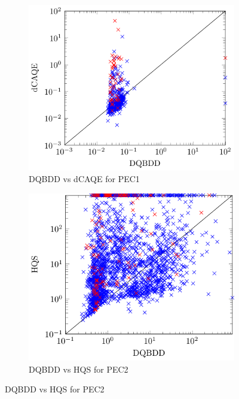 \documentclass[
  digital, %
  color,
  twoside, %
  table,   %
  nolof,     %
  nolot,     %
]{fithesis3}
\theoremstyle{definition}
\theoremstyle{remark}
\begin{document}
\begin{figure}[p]
  \centering
  \begin{subfigure}{0.48\textwidth}
    \centering
    \includegraphics[width=\linewidth]{figures/PEC1dqbddVSdcaqeSatUnsat.pdf}
    \caption{DQBDD vs dCAQE for PEC1}
    \label{fig:PEC1dqbddVSdcaqe}
  \end{subfigure}
  \begin{subfigure}{0.48\textwidth}
    \centering
    \includegraphics[width=\linewidth]{figures/PEC2dqbddVShqsSatUnsat.pdf}
    \caption{DQBDD vs HQS for PEC2}
    \label{fig:PEC2dqbddVShqs}
  \end{subfigure}

\end{figure}
\end{document}
